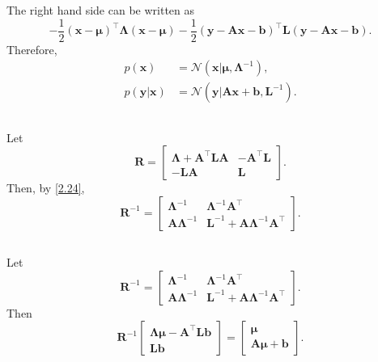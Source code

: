 %
The right hand side can be written as
%
\begin{equation}
-
\frac{1}{2}
(\mathbf{x} - \bm{\mu}) ^ \intercal
\bm{\Lambda} 
(\mathbf{x} - \bm{\mu})
-
\frac{1}{2}
\left(
	\mathbf{y} 
	- 
	\mathbf{A} 
	\mathbf{x} 
	- 
	\mathbf{b} 
\right) ^ \intercal
\mathbf{L}
\left(
	\mathbf{y} 
	- 
	\mathbf{A} 
	\mathbf{x} 
	- 
	\mathbf{b}
\right).
\end{equation}
%
Therefore,
%
\begin{equation}
\begin{aligned}
p(\mathbf{x})
&=
\mathcal{N} 
\left(
	\mathbf{x}
	| 
	\bm{\mu}, 
	\bm{\Lambda} ^ {- 1}
\right),
\\
p(\mathbf{y} | \mathbf{x})
&=
\mathcal{N} 
\left(
	\mathbf{y} 
	| 
	\mathbf{A} 
	\mathbf{x} 
	+ 
	\mathbf{b}, 
	\mathbf{L} ^ {- 1}
\right).
\end{aligned}
\end{equation}
%



\subsection{}
\label{2.29}
Let
%
\[
\mathbf{R}
=
\begin{bmatrix}
\bm{\Lambda} 
+ 
\mathbf{A} ^ \intercal 
\mathbf{L} 
\mathbf{A} 
& 
- 
\mathbf{A} ^ \intercal 
\mathbf{L} 
\\
- 
\mathbf{L} 
\mathbf{A}
& 
\mathbf{L}
\end{bmatrix}
.
\]
%
Then, by \ref{2.24}, 
%
\[
\mathbf{R} ^ {- 1}
=
\begin{bmatrix}
\bm{\Lambda} ^ {- 1} 
& 
\bm{\Lambda} ^ {- 1}  
\mathbf{A} ^ \intercal 
\\
\mathbf{A} 
\bm{\Lambda} ^ {- 1}
& 
\mathbf{L} ^ {- 1} 
+ 
\mathbf{A} 
\bm{\Lambda} ^ {- 1} 
\mathbf{A} ^ \intercal
\end{bmatrix}
.
\]
%


\subsection{}
\label{2.30}
Let
%
\[
\mathbf{R} ^ {- 1}
=
\begin{bmatrix}
\bm{\Lambda} ^ {- 1} 
& 
\bm{\Lambda} ^ {- 1}  
\mathbf{A} ^ \intercal 
\\
\mathbf{A} 
\bm{\Lambda} ^ {- 1}
& 
\mathbf{L} ^ {- 1} 
+ 
\mathbf{A} 
\bm{\Lambda} ^ {- 1} 
\mathbf{A} ^ \intercal
\end{bmatrix}
.
\]
%
Then
%
\[
\mathbf{R} ^ {- 1} 
\begin{bmatrix}
\bm{\Lambda} 
\bm{\mu} 
- 
\mathbf{A} ^ \intercal 
\mathbf{L} 
\mathbf{b} 
\\
\mathbf{L} 
\mathbf{b}
\end{bmatrix}
=
\begin{bmatrix}
\bm{\mu} 
\\
\mathbf{A} 
\bm{\mu} 
+ 
\mathbf{b}
\end{bmatrix}
.
\]
%


